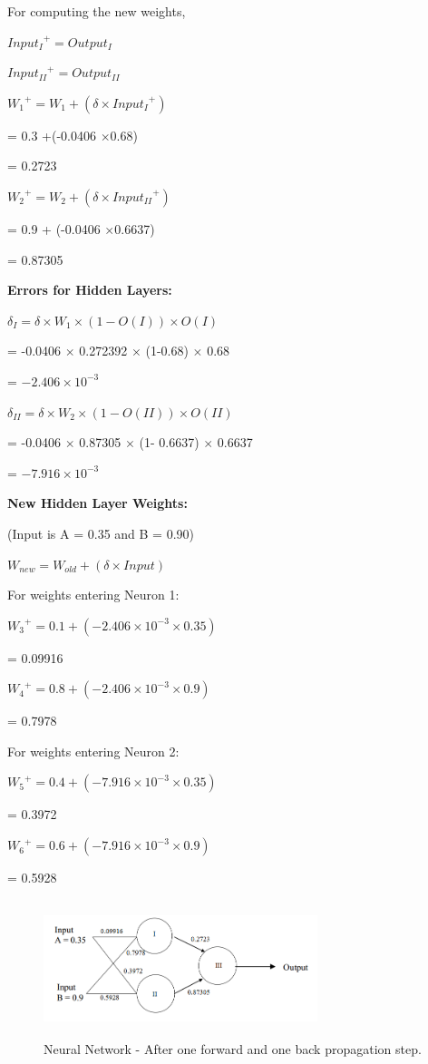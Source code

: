 For computing the new weights,

${Input_{I}}^+ = Output_{I}$ 
	
${Input_{II}}^+ = Output_{II}$
		
${W_{1}}^+ = {W_{1}} + (\delta \times {Input_{I}}^+ ) $
	
= 0.3 +(-0.0406 $\times$0.68)
	
= 0.2723
	
${W_{2}}^+ = {W_{2}} + (\delta \times{Input_{II}}^+ )$
	
= 0.9 + (-0.0406 $\times$0.6637)
	
= 0.87305
\newline
	
\textbf{Errors for Hidden Layers:}
	
${\delta}_{I} =\delta \times {W}_{1}  \times  (1-O(I))  \times  O(I)$
	
= -0.0406 $\times$ 0.272392 $\times$ (1-0.68) $\times$ 0.68
	
= $-2.406 \times {10}^{-3}$
	
${\delta}_{II} = \delta  \times {W}_{2}  \times (1-O(II)) \times O(II)$
	
= -0.0406 $\times$ 0.87305 $\times$ (1- 0.6637) $\times$ 0.6637
	
= $-7.916 \times {10}^{-3}$
\newline
	
\textbf{New Hidden Layer Weights:}

(Input is A = 0.35 and B = 0.90)
	
${W}_{new} = {W}_{old} + ( \delta   \times Input) $
	
For weights entering Neuron 1:
	
${W_{3}}^+ = 0.1 + (-2.406 \times {10}^{-3}  \times 0.35)$
	
= 0.09916
	
${W_{4}}^+ = 0.8 + (-2.406 \times {10}^{-3}  \times 0.9)$
	
= 0.7978
	
For weights entering Neuron 2:
	
${W_{5}}^+ = 0.4 + (-7.916 \times{10}^{-3}  \times 0.35)$
	
= 0.3972
	
${W_{6}}^+ = 0.6 + (-7.916 \times {10}^{-3}  \times 0.9)$
	
= 0.5928
	

\begin{figure}[ht!]
  \centering
  \includegraphics[height=40mm,  width=80mm]{figures/3_nnexample2.png}
  \caption[Neural Network - After one forward and one back propagation step]{Neural Network - After one forward and one back propagation step.}
  \label{nnexample2}
\end{figure}

